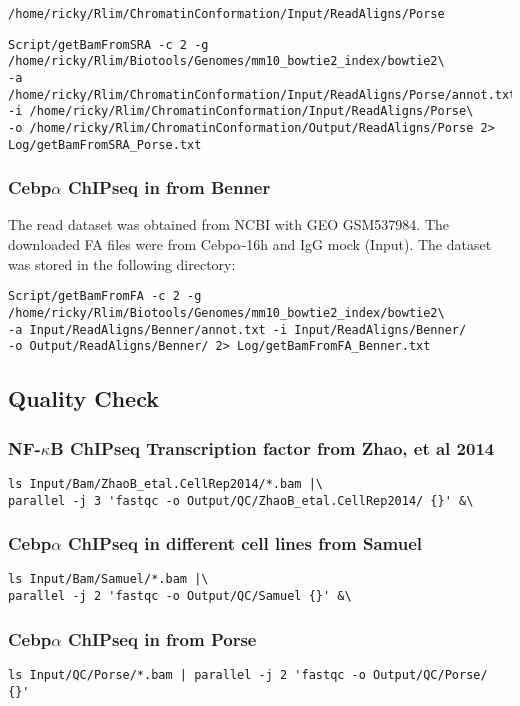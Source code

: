 \documentclass{article}\usepackage[]{graphicx}\usepackage[]{color}
\begin{document}
\verb|/home/ricky/Rlim/ChromatinConformation/Input/ReadAligns/Porse|            

\begin{verbatim}
Script/getBamFromSRA -c 2 -g /home/ricky/Rlim/Biotools/Genomes/mm10_bowtie2_index/bowtie2\ 
-a /home/ricky/Rlim/ChromatinConformation/Input/ReadAligns/Porse/annot.txt 
-i /home/ricky/Rlim/ChromatinConformation/Input/ReadAligns/Porse\
-o /home/ricky/Rlim/ChromatinConformation/Output/ReadAligns/Porse 2> Log/getBamFromSRA_Porse.txt 
\end{verbatim}

\subsubsection{Cebp$\alpha$ ChIPseq in from Benner}
The read dataset was obtained from NCBI with GEO GSM537984. 
The downloaded FA files were from Cebp$\alpha$-16h and IgG mock (Input).
The dataset was stored in the following directory:

\begin{verbatim}
Script/getBamFromFA -c 2 -g /home/ricky/Rlim/Biotools/Genomes/mm10_bowtie2_index/bowtie2\
-a Input/ReadAligns/Benner/annot.txt -i Input/ReadAligns/Benner/ 
-o Output/ReadAligns/Benner/ 2> Log/getBamFromFA_Benner.txt
\end{verbatim}


\subsection{Quality Check}
\subsubsection{NF-$\kappa$B ChIPseq Transcription factor from Zhao, et al 2014}
\begin{verbatim}
ls Input/Bam/ZhaoB_etal.CellRep2014/*.bam |\ 
parallel -j 3 'fastqc -o Output/QC/ZhaoB_etal.CellRep2014/ {}' &\
\end{verbatim}

\subsubsection{Cebp$\alpha$ ChIPseq in different cell lines from Samuel}
\begin{verbatim}
ls Input/Bam/Samuel/*.bam |\ 
parallel -j 2 'fastqc -o Output/QC/Samuel {}' &\
\end{verbatim}

\subsubsection{Cebp$\alpha$ ChIPseq in from Porse}
\begin{verbatim}
ls Input/QC/Porse/*.bam | parallel -j 2 'fastqc -o Output/QC/Porse/ {}'
\end{verbatim}
\end{document}
